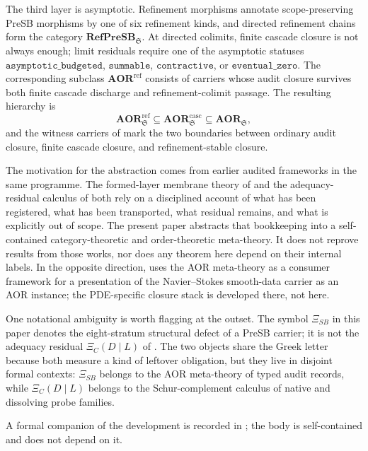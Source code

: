 \documentclass[11pt]{article}
\newcommand{\AOR}{\mathbf{AOR}}
\newcommand{\RefPreSB}{\mathbf{RefPreSB}}
\newcommand{\CascadeStableAOR}{\mathbf{AOR}^{\mathrm{casc}}}
\newcommand{\RefStableAOR}{\mathbf{AOR}^{\mathrm{ref}}}
\newcommand{\XiSB}{\Xi_{SB}}
\newcommand{\asymptoticBudgeted}{\texttt{asymptotic\_budgeted}}
\newcommand{\summable}{\texttt{summable}}
\newcommand{\contractive}{\texttt{contractive}}
\newcommand{\eventualZero}{\texttt{eventual\_zero}}
\theoremstyle{definition}
\begin{document}
The third layer is asymptotic.  Refinement morphisms annotate
scope-preserving PreSB morphisms by one of six refinement kinds, and
directed refinement chains form the category \(\RefPreSB_{\mathfrak S}\).
At directed colimits, finite cascade closure is not always enough; limit
residuals require one of the asymptotic statuses
\(\asymptoticBudgeted\), \(\summable\), \(\contractive\), or
\(\eventualZero\).  The corresponding subclass
\(\RefStableAOR\) consists of carriers whose audit closure survives both
finite cascade discharge and refinement-colimit passage.  The resulting
hierarchy is
\[
  \RefStableAOR_{\mathfrak S}
  \subseteq
  \CascadeStableAOR_{\mathfrak S}
  \subseteq
  \AOR_{\mathfrak S},
\]
and the witness carriers of  mark the two
boundaries between ordinary audit closure, finite cascade closure, and
refinement-stable closure.

The motivation for the abstraction comes from earlier audited
frameworks in the same programme.  The formed-layer membrane theory
of \citet{Tsiokos2026NeedleKiller} and the adequacy-residual calculus
of \citet{Tsiokos2026XiCompanion} both rely on a disciplined account
of what has been registered, what has been transported, what residual
remains, and what is explicitly out of scope.  The present paper
abstracts that bookkeeping into a self-contained category-theoretic
and order-theoretic meta-theory.  It does not reprove results from
those works, nor does any theorem here depend on their internal
labels.  In the opposite direction, \citet{Tsiokos2026NavierStokes}
uses the AOR meta-theory as a consumer framework for a presentation
of the Navier--Stokes smooth-data carrier as an AOR instance; the
PDE-specific closure stack is developed there, not here.

One notational ambiguity is worth flagging at the outset.  The symbol
\(\XiSB\) in this paper denotes the eight-stratum structural defect of
a PreSB carrier; it is not the adequacy residual \(\Xi_C(D\mid L)\) of
\citet{Tsiokos2026XiCompanion}.  The two objects share the Greek
letter because both measure a kind of leftover obligation, but they
live in disjoint formal contexts: \(\XiSB\) belongs to the AOR
meta-theory of typed audit records, while \(\Xi_C(D\mid L)\) belongs
to the Schur-complement calculus of native and dissolving probe
families.

A formal companion of the development is recorded in
; the body is self-contained and does not
depend on it.
\end{document}
